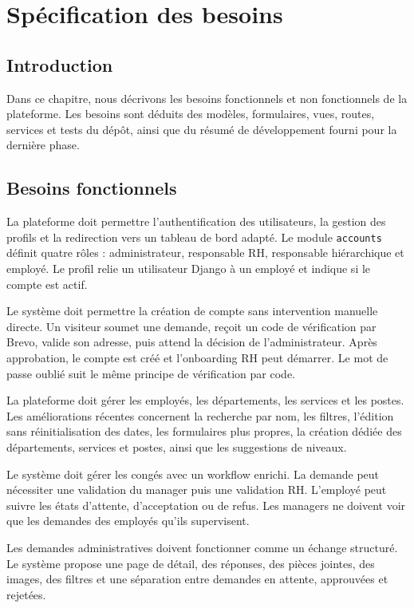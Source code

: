 \documentclass[12pt,a4paper]{report}
\begin{document}
\chapter{Spécification des besoins}
\section{Introduction}
Dans ce chapitre, nous décrivons les besoins fonctionnels et non fonctionnels de la plateforme. Les besoins sont déduits des modèles, formulaires, vues, routes, services et tests du dépôt, ainsi que du résumé de développement fourni pour la dernière phase.

\section{Besoins fonctionnels}
La plateforme doit permettre l'authentification des utilisateurs, la gestion des profils et la redirection vers un tableau de bord adapté. Le module \texttt{accounts} définit quatre rôles : administrateur, responsable RH, responsable hiérarchique et employé. Le profil relie un utilisateur Django à un employé et indique si le compte est actif.

Le système doit permettre la création de compte sans intervention manuelle directe. Un visiteur soumet une demande, reçoit un code de vérification par Brevo, valide son adresse, puis attend la décision de l'administrateur. Après approbation, le compte est créé et l'onboarding RH peut démarrer. Le mot de passe oublié suit le même principe de vérification par code.

La plateforme doit gérer les employés, les départements, les services et les postes. Les améliorations récentes concernent la recherche par nom, les filtres, l'édition sans réinitialisation des dates, les formulaires plus propres, la création dédiée des départements, services et postes, ainsi que les suggestions de niveaux.

Le système doit gérer les congés avec un workflow enrichi. La demande peut nécessiter une validation du manager puis une validation RH. L'employé peut suivre les états d'attente, d'acceptation ou de refus. Les managers ne doivent voir que les demandes des employés qu'ils supervisent.

Les demandes administratives doivent fonctionner comme un échange structuré. Le système propose une page de détail, des réponses, des pièces jointes, des images, des filtres et une séparation entre demandes en attente, approuvées et rejetées.
\end{document}
